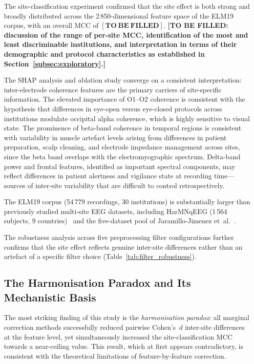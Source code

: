 \documentclass[preprint,12pt]{elsarticle}
\begin{document}
The site-classification experiment confirmed that the site effect is
both strong and broadly distributed across the 2\,850-dimensional
feature space of the ELM19 corpus, with an overall MCC of
$\mathbf{[TO\ BE\ FILLED]}$.
\textbf{[TO BE FILLED: discussion of the range of per-site MCC,
identification of the most and least discriminable institutions, and
interpretation in terms of their demographic and protocol
characteristics as established in Section~\ref{subsec:exploratory}.]}

The SHAP analysis and ablation study converge on a consistent
interpretation: inter-electrode coherence features are the primary
carriers of site-specific information.
The elevated importance of O1--O2 coherence is consistent with
the hypothesis that differences in eye-open versus eye-closed
protocols across institutions modulate occipital alpha coherence,
which is highly sensitive to visual state.
The prominence of beta-band coherence in temporal regions is
consistent with variability in muscle artefact levels arising from
differences in patient preparation, scalp cleaning, and electrode
impedance management across sites, since the beta band overlaps
with the electromyographic spectrum.
Delta-band power and frontal features, identified as important
spectral components, may reflect differences in patient alertness
and vigilance state at recording time---sources of inter-site
variability that are difficult to control retrospectively.

The ELM19 corpus (54\,779 recordings, 30 institutions) is
substantially larger than previously studied multi-site EEG datasets,
including HarMNqEEG (1\,564 subjects, 9
countries)~\cite{li2022harmnqeeg} and the five-dataset pool of
Jaramillo-Jimenez et~al.~\cite{jaramillo2024combat}.

The robustness analysis across five preprocessing filter
configurations further confirms that the site effect reflects genuine
inter-site differences rather than an artefact of a specific filter
choice (Table~\ref{tab:filter_robustness}).

\subsection{The Harmonisation Paradox and Its Mechanistic Basis}
\label{subsec:disc_paradox}

The most striking finding of this study is the \emph{harmonisation
paradox}: all marginal correction methods successfully reduced
pairwise Cohen's~$d$ inter-site differences at the feature level,
yet simultaneously increased the site-classification MCC towards
a near-ceiling value.
This result, which at first appears contradictory, is consistent with
the theoretical limitations of feature-by-feature correction.
\end{document}
